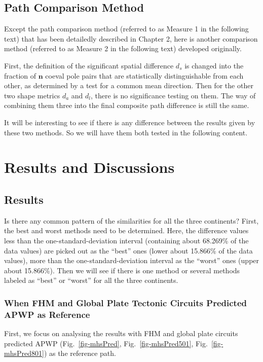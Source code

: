 \subsection{Path Comparison Method}

Except the path comparison method (referred to as Measure 1 in the following
text) that has been detailedly described in Chapter 2, here is another
comparison method (referred to as Measure 2 in the following text) developed
originally.

First, the definition of the significant spatial difference $d_s$ is changed
into the fraction of $\mathbf{n}$ coeval pole pairs that are statistically
distinguishable from each other, as determined by a test for a common mean
direction. Then for the other two shape metrics $d_a$ and $d_l$, there is no
significance testing on them. The way of combining them three into the final
composite path difference is still the same.

It will be interesting to see if there is any difference between the results
given by these two methods. So we will have them both tested in the following
content.

\section{Results and Discussions}

\subsection{Results}

Is there any common pattern of the similarities for all the three continents?
First, the best and worst methods need to be determined. Here, the difference
values less than the one-standard-deviation interval (containing about 68.269\%
of the data values) are picked out as the ``best'' ones (lower about 15.866\% of
the data values), more than the one-standard-deviation interval as the ``worst''
ones (upper about 15.866\%). Then we will see if there is one method or several
methods labeled as ``best'' or ``worst'' for all the three continents.

\subsubsection{When FHM and Global Plate Tectonic Circuits Predicted APWP as
Reference}

First, we focus on analysing the results with FHM and global plate circuits
predicted APWP (Fig.~\ref{fig-mhsPred}, Fig.~\ref{fig-mhsPred501},
Fig.~\ref{fig-mhsPred801}) as the reference path.

